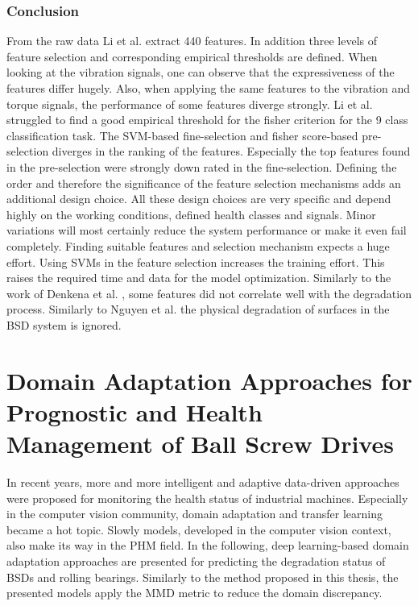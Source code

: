 \subsubsection{Conclusion}
From the raw data Li et al. extract 440 features. In addition three levels of feature selection and corresponding empirical thresholds are defined. When looking at the vibration signals, one can observe that the expressiveness of the features differ hugely. Also, when applying the same features to the vibration and torque signals, the performance of some features diverge strongly. Li et al. struggled to find a good empirical threshold for the fisher criterion for the 9 class classification task. The SVM-based fine-selection and fisher score-based pre-selection diverges in the ranking of the features. Especially the top features found in the pre-selection were strongly down rated in the fine-selection. Defining the order and therefore the significance of the feature selection mechanisms adds an additional design choice. All these design choices are very specific and depend highly on the working conditions, defined health classes and signals. Minor variations will most certainly reduce the system performance or make it even fail completely. Finding suitable features and selection mechanism expects a huge effort. Using SVMs in the feature selection increases the training effort. This raises the required time and data for the model optimization. Similarly to the work of Denkena et al. \cite{Denkena2021}, some features did not correlate well with the degradation process. Similarly to Nguyen et al. \cite{NGUYEN2019} the physical degradation of surfaces in the BSD system is ignored. 

\section{Domain Adaptation Approaches for Prognostic and Health Management of Ball Screw Drives}
In recent years, more and more intelligent and adaptive data-driven approaches were proposed for monitoring the health status of industrial machines. Especially in the computer vision community, domain adaptation and transfer learning became a hot topic. Slowly models, developed in the computer vision context, also make its way in the PHM field. In the following, deep learning-based domain adaptation approaches are presented for predicting the degradation status of BSDs and rolling bearings. Similarly to the method proposed in this thesis, the presented models apply the MMD metric to reduce the domain discrepancy.


